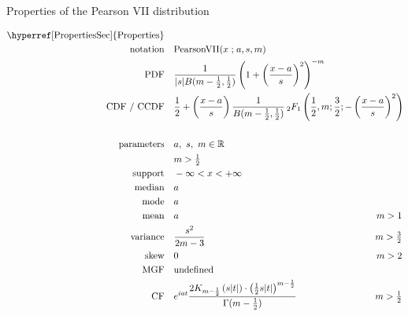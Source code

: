 

\begin{table*}[p]
\caption[Pearson VII distribution -- Properties]{Properties of the Pearson VII distribution}
\begin{align*}
\text{\hyperref[PropertiesSec]{Properties}}  \quad& \\
\text{notation} \quad & \text{PearsonVII}(x\given a,s, m) \checked
\\
\text{PDF}\quad &   \frac{1}{|s| B(m-\frac{1}{2}, \frac{1}{2} )} \left( 1 +\left( \frac{x-a}{s}\right)^2 \right)^{-m} \checked
\\
\text{CDF / CCDF} \quad  &  
     \frac{1}{2} +  \left(\frac{x-a}{s}\right) 
     \frac{1}{B(m-\frac{1}{2}, \frac{1}{2})}
     \,_2F_1 \left ( \frac{1}{2},m;\frac{3}{2}; -\left(\frac{x-a}{s}\right)^2 \right)
     \checked
     \hspace{-4em}
     \\
     &
\\
\text{parameters}\quad &   a,\ s,\ m  \in \Real \\ & m>\tfrac{1}{2} \checked
\\
\text{support} \quad &   -\infty < x < +\infty	\checked
\\
\text{median} \quad  &  a					\checked
\\
\text{mode} \quad  & a	\checked
\\
\text{mean} \quad  &  a & m>1	\checked
\\
\text{variance} \quad  & \frac{s^2}{2m-3} & m>\tfrac{3}{2} \checked
\\
\text{skew} \quad  &  0 \checked & m>2 \checked
\\
\text{MGF} \quad  &  \text{undefined}
\\
\text{CF} \quad  &   e^{iat} \frac{2 K_{m-\half} \left( s |t|\right)
                    \cdot \left(\half s |t| \right)^{m-\half}}
                    {\Gamma(m-\half)}  & m > \half
                    \checked
\end{align*}
\end{table*}